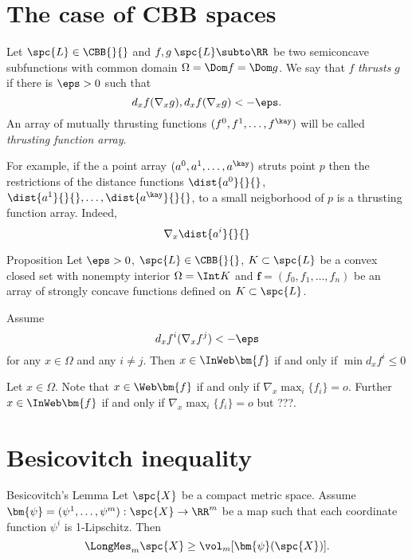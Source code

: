 \section{The case of CBB spaces}

Let $\spc{L}\in \CBB{}{}$ and $f,g\:\spc{L}\subto\RR$ be two semiconcave subfunctions with common domain $\Omega=\Dom f=\Dom g$. 
We say that $f$ \emph{thrusts} $g$  if there is $\eps>0$ such that
$$d_xf(\nabla_xg), d_xf(\nabla_xg)<-\eps.$$
An array of mutually thrusting functions $(f^0,f^1, \dots, f^\kay)$ will be called \emph{thrusting function array}.

For example, if the a point array $(a^0,a^1,\dots,a^\kay)$ struts point $p$ then the restrictions of the distance functions 
$\dist{a^0}{}{}$,
$\dist{a^1}{}{},\dots,\dist{a^\kay}{}{}$,
to a small neigborhood of $p$ is a thrusting function array.
Indeed,
$$\nabla_x\dist{a^i}{}{}$$

\begin{thm}{Proposition}
Let $\eps>0$,
$\spc{L}\in \CBB{}{}$,
$K\subset \spc{L}$ be a convex closed set with nonempty interior $\Omega=\Int K$ and
$\bm{f}=(f_0,f_1,\dots,f_n)$ be an array of strongly concave functions defined on $K\subset\spc{L}$.

Assume 
$$d_xf^i(\nabla_xf^j)<-\eps$$
for any $x\in \Omega$ and any $i\ne j$.
Then $x\in\InWeb\bm{f}$ if and only if 
$\min d_xf^i\le 0$
\end{thm}


Let $x\in\Omega$.
Note that $x\in\Web\bm{f}$ if and only if 
$\nabla_x\max_i\{f_i\}=o$.
Further $x\in\InWeb\bm{f}$ if and only if 
$\nabla_x\max_i\{f_i\}=o$ but ???.



















\section{Besicovitch inequality}%

\begin{thm}{Besicovitch's Lemma}\label{lem:besicovitch}
Let $\spc{X}$ be a compact metric space.
Assume $\bm{\psi}=(\psi^1,\dots,\psi^m):\spc{X}\to\RR^m$
be a map such that each coordinate function $\psi^i$
is 1-Lipschitz.
Then 
\[\LongMes_m\spc{X}\ge 
\vol_m[\bm{\psi}(\spc{X})].
\]
\end{thm}


